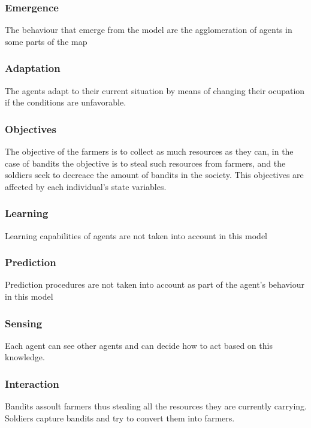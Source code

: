 \documentclass{wscpaperproc}
\theoremstyle{wsc}
\begin{document}
\subsubsection{Emergence}

The behaviour that emerge from the model are the agglomeration of agents in
some parts of the map

\subsubsection{Adaptation}

The agents adapt to their current situation by means of changing their
ocupation if the conditions are unfavorable.

\subsubsection{Objectives}

The objective of the farmers is to collect as much resources as they can, in
the case of bandits the objective is to steal such resources from farmers, and
the soldiers seek to decreace the amount of bandits in the society. This
objectives are affected by each individual's state variables.

\subsubsection{Learning}

Learning capabilities of agents are not taken into account in this model

\subsubsection{Prediction}

Prediction procedures are not taken into account as part of the agent's
behaviour in this model

\subsubsection{Sensing}

Each agent can see other agents and can decide how to act based on this
knowledge.

\subsubsection{Interaction}

Bandits assoult farmers thus stealing all the resources they are currently
carrying. Soldiers capture bandits and try to convert them into farmers.
\end{document}
